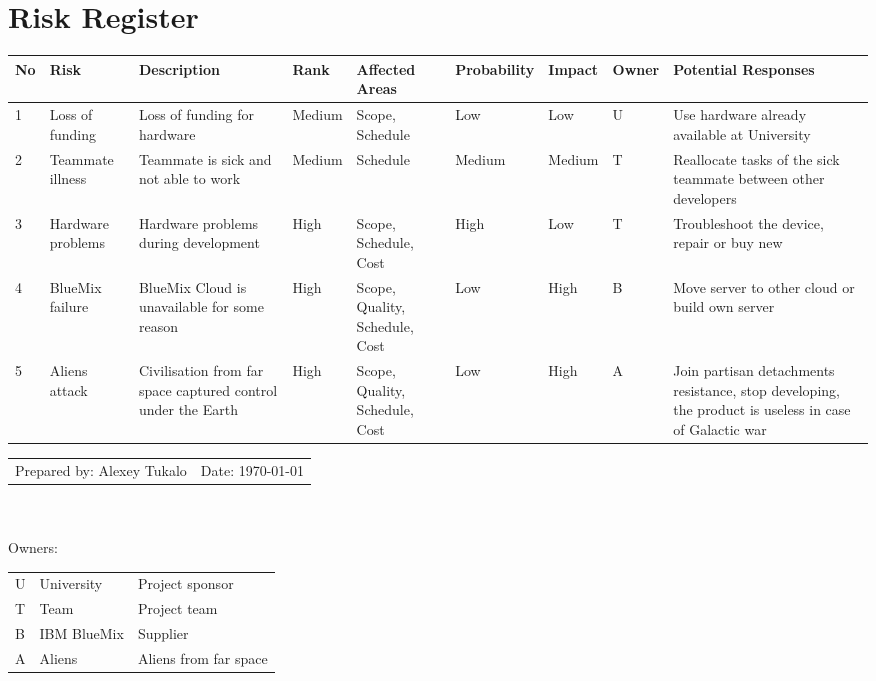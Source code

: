 \documentclass[english]{article}
\begin{document}
\section{Risk Register}

\begin{tabular}{|p{0.5cm}|p{2.5cm}|p{4cm}|p{1.5cm}|p{1.5cm}|p{1.5cm}|p{1.5cm}|p{1.5cm}|p{6cm}|}
  \hline  
No & Risk & Description & Rank & Affected Areas & Probability & Impact & Owner & Potential Responses \\
  \hline  
1 &
Loss of funding &
Loss of funding for hardware & 
Medium & 
Scope, Schedule & 
Low & 
Low & 
U & 
Use hardware already available at University \\
  \hline  
  2 &
Teammate illness &
Teammate is sick and not able to work  & 
Medium & 
Schedule & 
Medium & 
Medium & 
T & 
Reallocate tasks of the sick teammate between other developers \\
  \hline  
    3 &
Hardware problems &
Hardware problems during development & 
High & 
Scope, Schedule, Cost & 
High & 
Low & 
T & 
Troubleshoot the device, repair or buy new\\
  \hline  
      4 &
BlueMix failure &
BlueMix Cloud is unavailable for some reason  & 
High & 
Scope, Quality, Schedule, Cost & 
Low & 
High & 
B & 
Move server to other cloud or build own server\\
  \hline 
 5 &
Aliens attack &
Civilisation from far space captured control under the Earth & 
High & 
Scope, Quality, Schedule, Cost & 
Low & 
High & 
A & 
Join partisan detachments resistance, stop developing, the product is useless in case of Galactic war \\
  \hline 
  
\end{tabular}

\begin{tabular}{ l l}
\\
Prepared by: Alexey Tukalo & Date: \today \\

\end{tabular}\\\\
Owners:\\
\begin{tabular}{l l l}
U & University & Project sponsor\\
T & Team & Project team\\
B & IBM BlueMix & Supplier\\
A & Aliens & Aliens from far space\\
\end{tabular}
\newpage
\end{document}
